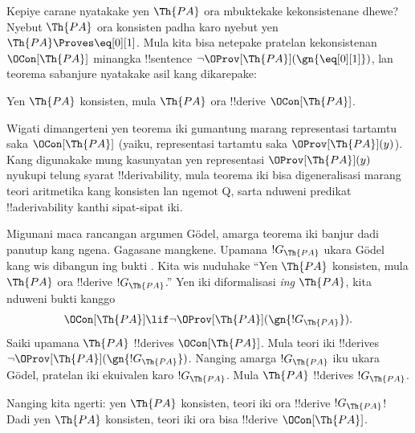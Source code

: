 \documentclass[../../../include/open-logic-section]{subfiles}
\begin{document}


Kepiye carane nyatakake yen $\Th{PA}$ ora mbuktekake
kekonsistenane dhewe? Nyebut $\Th{PA}$ ora konsisten padha karo
nyebut yen $\Th{PA} \Proves \eq[0][1]$. Mula kita bisa netepake
pratelan kekonsistenan $\OCon[\Th{PA}]$ minangka !!{sentence}
$\lnot \OProv[\Th{PA}](\gn{\eq[0][1]})$, lan teorema sabanjure
nyatakake asil kang dikarepake:

\begin{thm}
Yen $\Th{PA}$ konsisten, mula $\Th{PA}$ ora !!{derive}
$\OCon[\Th{PA}]$.
\end{thm}

Wigati dimangerteni yen teorema iki gumantung marang representasi
tartamtu saka $\OCon[\Th{PA}]$ (yaiku, representasi tartamtu saka
$\OProv[\Th{PA}](y)$). Kang digunakake mung kasunyatan yen
representasi $\OProv[\Th{PA}](y)$ nyukupi telung syarat
!!{derivability}, mula teorema iki bisa digeneralisasi marang
teori aritmetika kang konsisten lan ngemot Q, sarta nduweni predikat !!a{derivability} kanthi sipat-sipat
iki.

Migunani maca rancangan argumen G\"odel, amarga teorema iki banjur
dadi panutup kang ngena. Gagasane mangkene. Upamana $!G_\Th{PA}$
ukara G\"odel kang wis dibangun ing bukti
. Kita wis nuduhake
``Yen $\Th{PA}$ konsisten, mula $\Th{PA}$ ora !!{derive}
$!G_\Th{PA}$.'' Yen iki diformalisasi \emph{ing} $\Th{PA}$, kita
nduweni bukti kanggo
\[
\OCon[\Th{PA}] \lif \lnot \OProv[\Th{PA}](\gn{!G_\Th{PA}}).
\]
Saiki upamana $\Th{PA}$ !!{derive}s $\OCon[\Th{PA}]$. Mula teori iki
!!{derive}s $\lnot \OProv[\Th{PA}](\gn{!G_\Th{PA}})$. Nanging amarga
$!G_\Th{PA}$ iku ukara G\"odel, pratelan iki ekuivalen karo
$!G_\Th{PA}$. Mula $\Th{PA}$ !!{derive}s $!G_\Th{PA}$.

Nanging kita ngerti: yen $\Th{PA}$ konsisten, teori iki ora
!!{derive} $!G_\Th{PA}$!{} Dadi yen $\Th{PA}$ konsisten, teori iki
ora bisa !!{derive} $\OCon[\Th{PA}]$.
\end{document}
